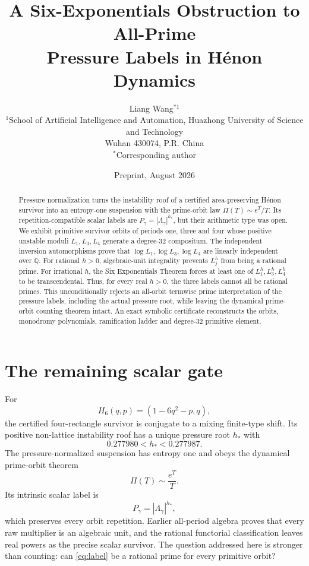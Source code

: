 \documentclass[11pt]{article}
\title{A Six-Exponentials Obstruction to All-Prime\\Pressure Labels in H\'enon Dynamics}
\author{Liang Wang$^{*1}$\\
\small $^{1}$School of Artificial Intelligence and Automation, Huazhong University of Science and Technology\\
\small Wuhan 430074, P.R. China\\
\small $^*$Corresponding author}
\date{Preprint, August 2026}
\theoremstyle{remark}\newtheorem{remark}[theorem]{Remark}
\begin{document}
\maketitle

\begin{abstract}
Pressure normalization turns the instability roof of a certified
area-preserving H\'enon survivor into an entropy-one suspension with the
prime-orbit law $\Pi(T)\sim e^T/T$.  Its repetition-compatible scalar labels
are $P_\gamma=|\Lambda_\gamma|^{h_*}$, but their arithmetic type was open.
We exhibit primitive survivor orbits of periods one, three and four whose
positive unstable moduli $L_1,L_3,L_4$ generate a degree-$32$ compositum.
The independent inversion automorphisms prove that
$\log L_1,\log L_3,\log L_4$ are linearly independent over $\mathbb Q$.
For rational $h>0$, algebraic-unit integrality prevents $L_j^h$ from being a
rational prime.  For irrational $h$, the Six Exponentials Theorem forces at
least one of $L_1^h,L_3^h,L_4^h$ to be transcendental.  Thus, for every real
$h>0$, the three labels cannot all be rational primes.  This unconditionally
rejects an all-orbit termwise prime interpretation of the pressure labels,
including the actual pressure root, while leaving the dynamical prime-orbit
counting theorem intact.  An exact symbolic certificate reconstructs the
orbits, monodromy polynomials, ramification ladder and degree-$32$ primitive
element.
\end{abstract}

\section{The remaining scalar gate}
For
\[
H_6(q,p)=(1-6q^2-p,q),
\]
the certified four-rectangle survivor is conjugate to a mixing finite-type
shift.  Its positive non-lattice instability roof has a unique pressure root
$h_*$ with
\[
0.277980<h_*<0.277987.
\]
The pressure-normalized suspension has entropy one and obeys the dynamical
prime-orbit theorem
\[
\Pi(T)\sim \frac{e^T}{T}.
\]
Its intrinsic scalar label is
\begin{equation}\label{eq:label}
P_\gamma=|\Lambda_\gamma|^{h_*},
\end{equation}
which preserves every orbit repetition.  Earlier all-period algebra proves
that every raw multiplier is an algebraic unit, and the rational functorial
classification leaves real powers as the precise scalar survivor.  The
question addressed here is stronger than counting:
can \eqref{eq:label} be a rational prime for every primitive orbit?
\end{document}
